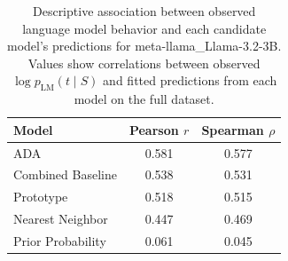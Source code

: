\begin{table}

\caption{\label{tab:tab:model-correlations}Descriptive association between observed language model behavior and each candidate model's predictions for meta-llama_Llama-3.2-3B. Values show correlations between observed $\log p_{\mathrm{LM}}(t \mid S)$ and fitted predictions from each model on the full dataset.}
\centering
\begin{tabular}[t]{lcc}
\toprule
Model & Pearson $r$ & Spearman $\rho$\\
\midrule
ADA & 0.581 & 0.577\\
Combined Baseline & 0.538 & 0.531\\
Prototype & 0.518 & 0.515\\
Nearest Neighbor & 0.447 & 0.469\\
Prior Probability & 0.061 & 0.045\\
\bottomrule
\end{tabular}
\end{table}
